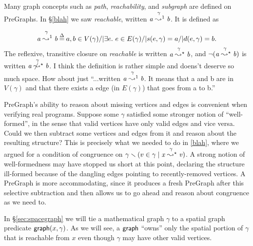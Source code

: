 Many graph concepts such as \emph{path}, \emph{reachability}, and \emph{subgraph} are 
defined on PreGraphs. In \S\ref{blah} we saw \emph{reachable}, written 
$\mathit{a} \mathrel{{\stackrel{\gamma~}{\leadsto^{1}}}} \mathit{b}$. It is 
defined as 

$$\mathit{a} \mathrel{{\stackrel{\gamma~}{\leadsto^{1}}}} \mathit{b} \mathbin{\stackrel{\Delta}{=}} a, b \in V(\gamma) /| \exists e.~ e \in E(\gamma) /| s (e,\gamma) = a /| 
d (e,\gamma) = b.$$ 
The reflexive, transitive closure on \emph{reachable} is written 
$\mathit{a} \mathrel{{\stackrel{\gamma~}{\leadsto^{\star}}}} \mathit{b}$, and 
$\neg (\mathit{a} \mathrel{{\stackrel{\gamma~}{\leadsto^{\star}}}} \mathit{b})$ 
is written $\mathit{a} \mathrel{{\stackrel{\gamma~}{\not\leadsto^{\star}}}} \mathit{b}$.
{\color{blue} I think the definition is rather simple and doens't deserve so much space.
How about just ``...written $\mathit{a} \mathrel{{\stackrel{\gamma~}{\leadsto^{1}}}} \mathit{b}$.
It means that a and b are in $V(\gamma)$ and that there exists a edge (in $E(\gamma)$)
that goes from a to b.''}

PreGraph's ability to reason about missing vertices and edges is convenient when 
verifying real programs. Suppose some $\gamma$ satisfied some stronger notion of
``well-formed'', in the sense that valid vertices have only valid edges and 
vice versa. Could we then subtract some vertices and edges from it and reason about the 
resulting structure? This is precisely what we needed to do in \ref{blah}, where
we argued for a condition of congruence on 
$\gamma \smallsetminus (v \in \gamma \mid \mathit{x} 
\mathrel{{\stackrel{\gamma~}{\leadsto^{\star}}}} \mathit{v})$. 
A strong notion of well-formedness may have stopped us short at this point, 
declaring the structure ill-formed because of the dangling edges 
pointing to recently-removed vertices. 
A PreGraph is more accommodating, since
it produces a fresh PreGraph after this selective subtraction 
and then allows us to go ahead and reason about congruence as we need to.


\hide
{In \S\ref{sec:spacegraph} we will tie a mathematical graph $\gamma$ to 
a spatial graph predicate
$\mathsf{graph}(x, \gamma)$.   As we will see, a $\mathsf{graph}$ ``owns'' only the
spatial portion of $\gamma$ that is reachable
from $x$ even though $\gamma$ may have other valid vertices.
} %
\fi
\iffalse
